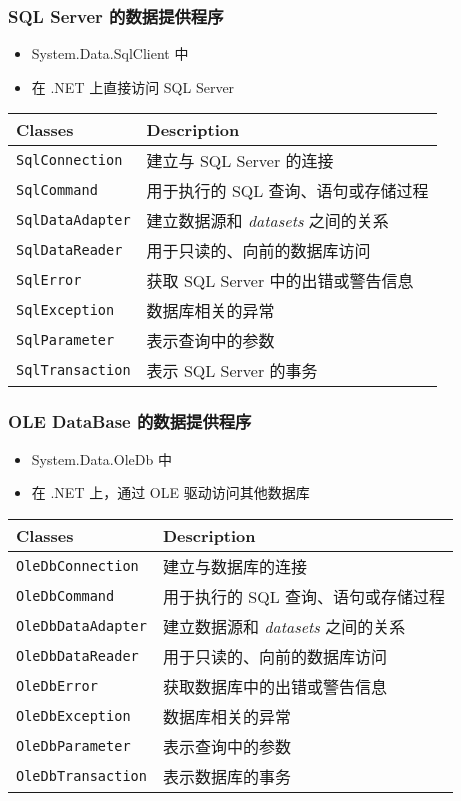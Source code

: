 \begin{frame}
\frametitle{SQL Server 的数据提供程序}

\begin{itemize}
\item System.Data.SqlClient 中
\item 在 .NET 上直接访问 SQL Server
\end{itemize}

  \begin{tabular}{l|l}
    \hline
    \textbf{Classes} & \textbf{Description} \\
    \hline
    \texttt{SqlConnection} & 建立与 SQL Server 的连接 \\
    \texttt{SqlCommand} & 用于执行的 SQL 查询、语句或存储过程 \\
    \texttt{SqlDataAdapter} & 建立数据源和 \textit{datasets} 之间的关系 \\
    \texttt{SqlDataReader} & 用于只读的、向前的数据库访问 \\
    \texttt{SqlError} & 获取 SQL Server 中的出错或警告信息 \\
    \texttt{SqlException} & 数据库相关的异常 \\
    \texttt{SqlParameter} & 表示查询中的参数 \\
    \texttt{SqlTransaction} & 表示 SQL Server 的事务 \\
    \hline
  \end{tabular}

\end{frame}

\begin{frame}
\frametitle{OLE DataBase 的数据提供程序}

\begin{itemize}
\item System.Data.OleDb 中
\item 在 .NET 上，通过 OLE 驱动访问其他数据库
\end{itemize}

  \begin{tabular}{l|l}
    \hline
    \textbf{Classes} & \textbf{Description} \\
    \hline
    \texttt{OleDbConnection} & 建立与数据库的连接 \\
    \texttt{OleDbCommand} & 用于执行的 SQL 查询、语句或存储过程 \\
    \texttt{OleDbDataAdapter} & 建立数据源和 \textit{datasets} 之间的关系 \\
    \texttt{OleDbDataReader} & 用于只读的、向前的数据库访问 \\
    \texttt{OleDbError} & 获取数据库中的出错或警告信息 \\
    \texttt{OleDbException} & 数据库相关的异常 \\
    \texttt{OleDbParameter} & 表示查询中的参数 \\
    \texttt{OleDbTransaction} & 表示数据库的事务 \\
    \hline
  \end{tabular}

\end{frame}

